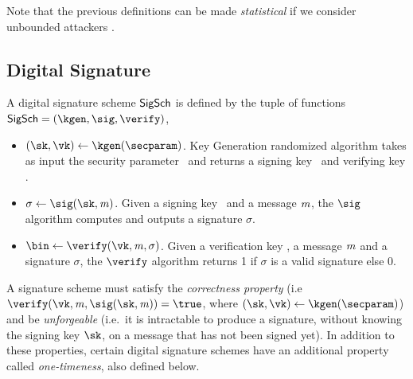 Note that the previous definitions can be made \emph{statistical} if we consider unbounded attackers \adv.

\subsection{Digital Signature}\label{preliminaries:definitions:digital-signature}

\begin{definition}
    A digital signature scheme $\mathsf{SigSch}$ is defined by the tuple of functions $\sigscheme = (\kgen, \sig, \verify)$,
    \begin{itemize}
        \item $(\sk, \vk) \gets \kgen(\secparam)$. Key Generation randomized algorithm takes as input the security parameter \secparam~and returns a signing key \sk~and verifying key \vk.
        \item $\sigma \gets \sig(\sk, \msg)$. Given a signing key \sk~and a message $\mathit{m}$, the $\sig$ algorithm computes and outputs a signature $\sigma$.
        \item $\bin \gets \verify(\vk, \msg, \sigma)$. Given a verification key \vk, a message $\mathit{m}$ and a signature $\sigma$, the $\verify$ algorithm returns 1 if $\sigma$ is a valid signature else 0.
    \end{itemize}
\end{definition}

A signature scheme must satisfy the \emph{correctness property} (i.e~$\verify(\vk, \msg, \sig(\sk, \msg)) = \true$, where $(\sk, \vk) \gets \kgen(\secparam)$) and be \emph{unforgeable} (i.e.~it is intractable to produce a signature, without knowing the signing key $\sk$, on a message that has not been signed yet). In addition to these properties, certain digital signature schemes have an additional property called \emph{one-timeness}, also defined below.

